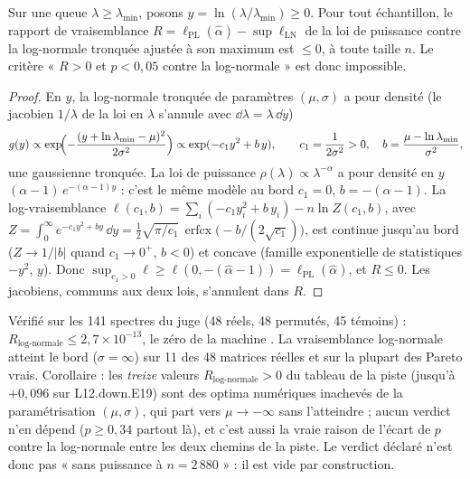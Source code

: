 \begin{theoreme}\label{t3spe:thm:bord}
Sur une queue $\lambda \ge \lambda_{\min}$, posons $y = \ln(\lambda/\lambda_{\min}) \ge 0$. Pour tout échantillon, le rapport de vraisemblance $R = \ell_{\mathrm{PL}}(\hat\alpha) - \sup \ell_{\mathrm{LN}}$ de la loi de puissance contre la log-normale tronquée ajustée à son maximum est $\le 0$, à toute taille $n$. Le critère « $R > 0$ et $p < 0{,}05$ contre la log-normale » est donc impossible.
\end{theoreme}
\begin{proof}
En $y$, la log-normale tronquée de paramètres $(\mu, \sigma)$ a pour densité (le jacobien $1/\lambda$ de la loi en $\lambda$ s'annule avec $\dd\lambda = \lambda\,\dd y$)
\[
g(y) \propto \exp\!\Bigl(-\frac{(y + \ln\lambda_{\min} - \mu)^2}{2\sigma^2}\Bigr) \propto \exp(-c_1 y^2 + b\,y), \qquad c_1 = \frac{1}{2\sigma^2} > 0,\quad b = \frac{\mu - \ln\lambda_{\min}}{\sigma^2},
\]
une gaussienne tronquée. La loi de puissance $\rho(\lambda) \propto \lambda^{-\alpha}$ a pour densité en $y$ $(\alpha - 1)\,e^{-(\alpha - 1)y}$ : c'est le même modèle au bord $c_1 = 0$, $b = -(\alpha - 1)$. La log-vraisemblance $\ell(c_1, b) = \sum_i(-c_1 y_i^2 + b\,y_i) - n\ln Z(c_1, b)$, avec $Z = \int_0^\infty e^{-c_1 y^2 + by}\,\dd y = \tfrac12\sqrt{\pi/c_1}\,\operatorname{erfcx}\bigl(-b/(2\sqrt{c_1})\bigr)$, est continue jusqu'au bord ($Z \to 1/|b|$ quand $c_1 \to 0^+$, $b < 0$) et concave (famille exponentielle de statistiques $-y^2$, $y$). Donc $\sup_{c_1 > 0} \ell \ge \ell(0, -(\hat\alpha - 1)) = \ell_{\mathrm{PL}}(\hat\alpha)$, et $R \le 0$. Les jacobiens, communs aux deux lois, s'annulent dans $R$.
\end{proof}

Vérifié sur les 141 spectres du juge (48 réels, 48 permutés, 45 témoins) : $R_{\text{log-normale}} \le 2{,}7 \times 10^{-13}$, le zéro de la machine \mes. La vraisemblance log-normale atteint le bord ($\sigma = \infty$) sur 11 des 48 matrices réelles et sur la plupart des Pareto vrais. Corollaire : les \emph{treize} valeurs $R_{\text{log-normale}} > 0$ du tableau de la piste (jusqu'à $+0{,}096$ sur L12.down.E19) sont des optima numériques inachevés de la paramétrisation $(\mu, \sigma)$, qui part vers $\mu \to -\infty$ sans l'atteindre ; aucun verdict n'en dépend ($p \ge 0{,}34$ partout là), et c'est aussi la vraie raison de l'écart de $p$ contre la log-normale entre les deux chemins de la piste. Le verdict déclaré n'est donc pas « sans puissance à $n = 2\,880$ » : il est vide par construction.

